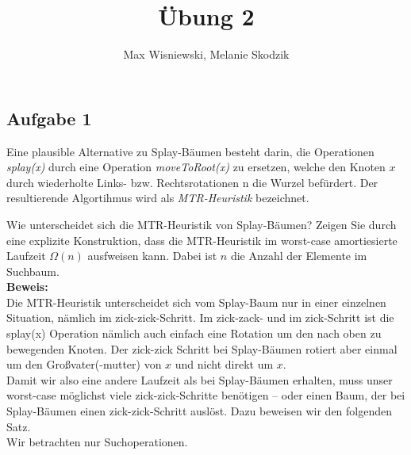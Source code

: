 \documentclass[11pt,a4paper,ngerman]{article}
\date{}
\title{Übung 2}
\author{Max Wisniewski, Melanie Skodzik}
\begin{document}

\renewcommand{\figurename}{Figure}

\maketitle
\thispagestyle{fancy}


\subsection*{Aufgabe 1}


Eine plausible Alternative zu Splay-Bäumen besteht darin, die Operationen \emph{splay(x)} durch eine Operation \emph{moveToRoot(x)} zu ersetzen, welche den Knoten $x$ durch wiederholte Links- bzw. Rechtsrotationen n die Wurzel befürdert. Der resultierende Algortihmus wird als \emph{MTR-Heuristik} bezeichnet.

Wie unterscheidet sich die MTR-Heuristik von Splay-Bäumen? Zeigen Sie durch eine explizite Konstruktion, dass die MTR-Heuristik im worst-case amortiesierte Laufzeit $\Omega(n)$ ausfweisen kann. Dabei ist $n$ die Anzahl der Elemente im Suchbaum.\\

\noindent\textbf{Beweis:}\\

Die MTR-Heuristik unterscheidet sich vom Splay-Baum nur in einer einzelnen Situation, nämlich im zick-zick-Schritt. Im zick-zack- und im zick-Schritt ist die splay(x) Operation nämlich auch einfach eine Rotation um den nach oben zu bewegenden Knoten. Der zick-zick Schritt bei Splay-Bäumen rotiert aber einmal um den Großvater(-mutter) von $x$ und nicht direkt um $x$.\\

Damit wir also eine andere Laufzeit als bei Splay-Bäumen erhalten, muss unser worst-case möglichst viele zick-zick-Schritte benötigen -- oder einen Baum, der bei Splay-Bäumen einen zick-zick-Schritt auslöst. Dazu beweisen wir den folgenden Satz.\\

Wir betrachten nur Suchoperationen.
\end{document}

